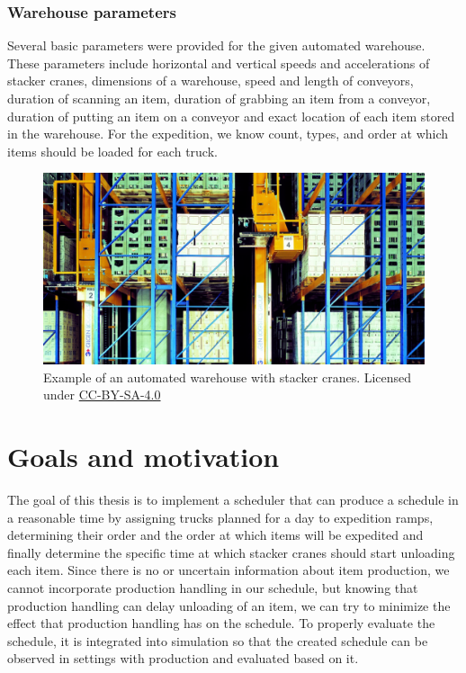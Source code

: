 \documentclass{ctuthesis}
\begin{document}
\subsubsection{Warehouse parameters}
\label{sec:availableinformation}
Several basic parameters were provided for the given automated warehouse. These parameters include horizontal and vertical speeds and accelerations of stacker cranes, dimensions of a warehouse, speed and length of conveyors, duration of scanning an item, duration of grabbing an item from a conveyor, duration of putting an item on a conveyor and exact location of each item stored in the warehouse. For the expedition, we know count, types, and order at which items should be loaded for each truck. 

\begin{figure}
\includegraphics[width=1\linewidth]{highbaywarehouse.jpg}
\caption{Example of an automated warehouse with stacker cranes. Licensed under \href{https://commons.wikimedia.org/wiki/Category:CC-BY-SA-4.0}{CC-BY-SA-4.0} \cite{warehousepic}}
\label{fig:hb}
\end{figure}

\section{Goals and motivation}

The goal of this thesis is to implement a scheduler that can produce a schedule in a reasonable time by assigning trucks planned for a day to expedition ramps, determining their order and the order at which items will be expedited and finally determine the specific time at which stacker cranes should start unloading each item. Since there is no or uncertain information about item production, we cannot incorporate production handling in our schedule, but knowing that production handling can delay unloading of an item, we can try to minimize the effect that production handling has on the schedule. To properly evaluate the schedule, it is integrated into simulation so that the created schedule can be observed in settings with production and evaluated based on it. 
\end{document}
